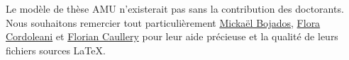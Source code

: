 Le modèle de thèse AMU n'existerait pas sans la contribution des doctorants. Nous souhaitons remercier tout particulièrement \href{http://www.theses.fr/2011AIX20720}{Mickaël Bojados}, \href{http://www.theses.fr/2011AIX22111}{Flora Cordoleani} et \href{http://www.theses.fr/s109933}{Florian Caullery} pour leur aide précieuse et la qualité de leurs fichiers sources LaTeX.

\lipsum[1-2]